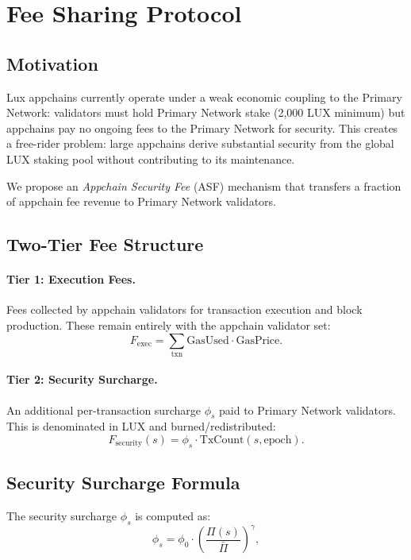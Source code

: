 \section{Fee Sharing Protocol}

\label{sec:feesharing}

\subsection{Motivation}

Lux appchains currently operate under a weak economic coupling to the Primary Network:
validators must hold Primary Network stake (2,000 LUX minimum) but appchains pay no
ongoing fees to the Primary Network for security. This creates a free-rider problem:
large appchains derive substantial security from the global LUX staking pool without
contributing to its maintenance.

We propose an \emph{Appchain Security Fee} (ASF) mechanism that transfers a fraction of
appchain fee revenue to Primary Network validators.

\subsection{Two-Tier Fee Structure}

\paragraph{Tier 1: Execution Fees.}
Fees collected by appchain validators for transaction execution and block production.
These remain entirely with the appchain validator set:
\[
  F_{\text{exec}} = \sum_{\text{txn}} \text{GasUsed} \cdot \text{GasPrice}.
\]

\paragraph{Tier 2: Security Surcharge.}
An additional per-transaction surcharge $\phi_s$ paid to Primary Network validators.
This is denominated in LUX and burned/redistributed:
\[
  F_{\text{security}}(s) = \phi_s \cdot \text{TxCount}(s, \text{epoch}).
\]

\subsection{Security Surcharge Formula}

The security surcharge $\phi_s$ is computed as:
\begin{equation}
  \phi_s = \phi_0 \cdot \left(\frac{\Pi(s)}{\bar{\Pi}}\right)^\gamma,
  \label{eq:surcharge}
\end{equation}

